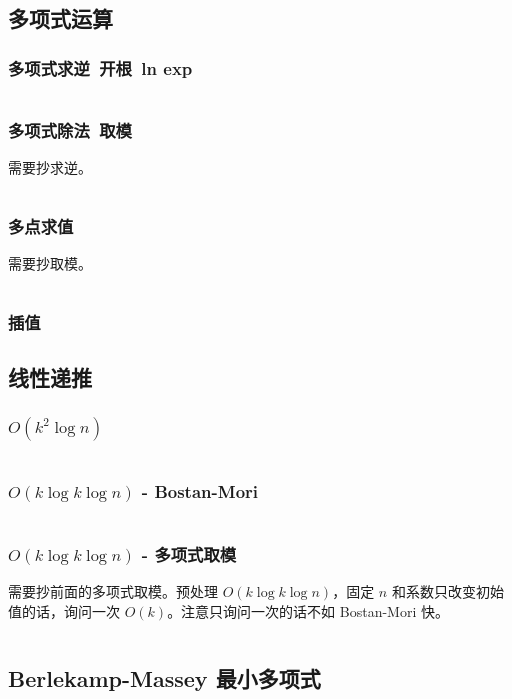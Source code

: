 \documentclass[titlepage, a4paper]{article}
\begin{document}
\begin{multicols}{2}
\begin{spacing}{0.6}
				\subsection{多项式运算}
					\subsubsection{多项式求逆\ 开根\ ln exp}
						\inputminted{cpp}{src/Math/多项式运算.cpp}
					\subsubsection{多项式除法\ 取模}
						需要抄求逆。
						\inputminted{cpp}{src/Math/多项式取模.cpp}
					\subsubsection{多点求值}
						需要抄取模。
						\inputminted{cpp}{src/Math/多点求值.cpp}
					\subsubsection{插值}
						
				\subsection{线性递推}
					\subsubsection*{$O(k^2 \log n)$}
						\inputminted{cpp}{src/Math/线性递推.cpp}
					\subsubsection*{$O(k \log k \log n)$ - Bostan-Mori}
						\inputminted{cpp}{src/Math/快速线性递推-bostan-mori.cpp}
					\subsubsection*{$O(k \log k \log n)$ - 多项式取模}
						需要抄前面的多项式取模。预处理 $O(k \log k \log n)$，固定 $n$ 和系数只改变初始值的话，询问一次 $O(k)$。注意只询问一次的话不如 Bostan-Mori 快。
						\inputminted{cpp}{src/Math/快速线性递推-多项式取模.cpp}
				\subsection{Berlekamp-Massey 最小多项式}
					

\end{spacing}
\end{multicols}
\end{document}
